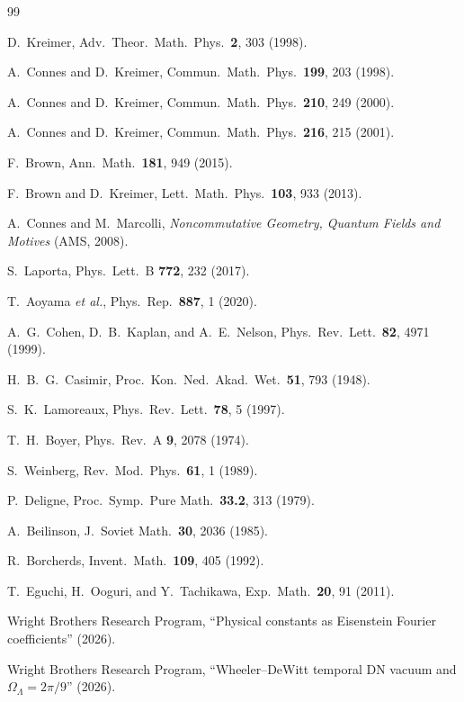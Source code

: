 \documentclass[11pt,a4paper]{article}
\begin{document}
\begin{thebibliography}{99}

D.~Kreimer, Adv.\ Theor.\ Math.\ Phys.\ \textbf{2}, 303 (1998).

A.~Connes and D.~Kreimer,
Commun.\ Math.\ Phys.\ \textbf{199}, 203 (1998).

A.~Connes and D.~Kreimer,
Commun.\ Math.\ Phys.\ \textbf{210}, 249 (2000).

A.~Connes and D.~Kreimer,
Commun.\ Math.\ Phys.\ \textbf{216}, 215 (2001).

F.~Brown, Ann.\ Math.\ \textbf{181}, 949 (2015).

F.~Brown and D.~Kreimer,
Lett.\ Math.\ Phys.\ \textbf{103}, 933 (2013).

A.~Connes and M.~Marcolli, \textit{Noncommutative Geometry,
Quantum Fields and Motives} (AMS, 2008).

S.~Laporta, Phys.\ Lett.\ B \textbf{772}, 232 (2017).

T.~Aoyama \textit{et al.},
Phys.\ Rep.\ \textbf{887}, 1 (2020).

A.~G.~Cohen, D.~B.~Kaplan, and A.~E.~Nelson,
Phys.\ Rev.\ Lett.\ \textbf{82}, 4971 (1999).

H.~B.~G.~Casimir,
Proc.\ Kon.\ Ned.\ Akad.\ Wet.\ \textbf{51}, 793 (1948).

S.~K.~Lamoreaux,
Phys.\ Rev.\ Lett.\ \textbf{78}, 5 (1997).

T.~H.~Boyer, Phys.\ Rev.\ A \textbf{9}, 2078 (1974).

S.~Weinberg, Rev.\ Mod.\ Phys.\ \textbf{61}, 1 (1989).

P.~Deligne, Proc.\ Symp.\ Pure Math.\ \textbf{33.2}, 313 (1979).

A.~Beilinson, J.\ Soviet Math.\ \textbf{30}, 2036 (1985).

R.~Borcherds, Invent.\ Math.\ \textbf{109}, 405 (1992).

T.~Eguchi, H.~Ooguri, and Y.~Tachikawa,
Exp.\ Math.\ \textbf{20}, 91 (2011).

Wright Brothers Research Program,
``Physical constants as Eisenstein Fourier coefficients'' (2026).

Wright Brothers Research Program,
``Wheeler--DeWitt temporal DN vacuum and
$\Omega_\Lambda = 2\pi/9$'' (2026).

\end{thebibliography}
\end{document}
